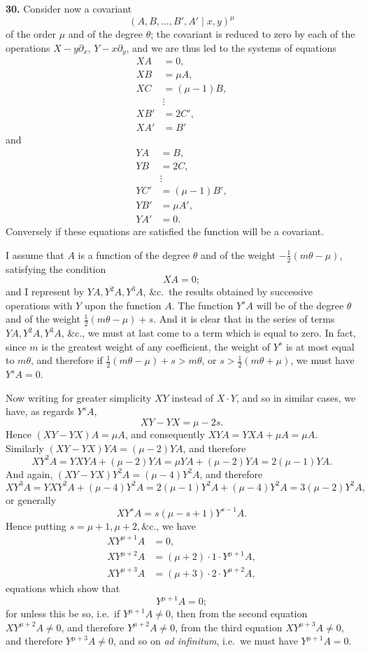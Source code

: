 \documentclass[11pt]{article}
\begin{document}
\textbf{30.} Consider now a covariant
\[
(A, B, \ldots, B', A' \mid x, y)^\mu
\]
of the order $\mu$ and of the degree $\theta$; the covariant is reduced to zero by each of the operations $X - y\partial_x$, $Y - x\partial_y$, and we are thus led to the systems of equations
\begin{align*}
XA &= 0, \\
XB &= \mu A, \\
XC &= (\mu - 1)B, \\
&\vdots \\
XB' &= 2 C', \\
XA' &= B'
\end{align*}
and
\begin{align*}
YA &= B, \\
YB &= 2 C, \\
&\vdots \\
YC' &= (\mu - 1)B', \\
YB' &= \mu A', \\
YA' &= 0.
\end{align*}
Conversely if these equations are satisfied the function will be a covariant.

I assume that $A$ is a function of the degree $\theta$ and of the weight $-\tfrac{1}{2}(m\theta - \mu)$, satisfying the condition
\[
XA = 0;
\]
and I represent by $YA, Y^2A, Y^3A$, \&c.\ the results obtained by successive operations with $Y$ upon the function $A$. The function $Y^s A$ will be of the degree $\theta$ and of the weight $\tfrac{1}{2}(m\theta - \mu) + s$. And it is clear that in the series of terms $YA, Y^2A, Y^3A$, \&c., we must at last come to a term which is equal to zero. In fact, since $m$ is the greatest weight of any coefficient, the weight of $Y^s$ is at most equal to $m\theta$, and therefore if $\tfrac{1}{2}(m\theta - \mu) + s > m\theta$, or $s > \tfrac{1}{2}(m\theta + \mu)$, we must have $Y^s A = 0$.

Now writing for greater simplicity $XY$ instead of $X\cdot Y$, and so in similar cases, we have, as regards $Y^s A$,
\[
XY - YX = \mu - 2s.
\]
Hence $(XY - YX)A = \mu A$, and consequently $XYA = YXA + \mu A = \mu A$.
Similarly $(XY - YX) YA = (\mu - 2) YA$, and therefore
\[
XY^2 A = YXYA + (\mu - 2) YA = \mu YA + (\mu - 2)YA = 2(\mu - 1) YA.
\]
And again, $(XY - YX) Y^2 A = (\mu - 4) Y^2 A$, and therefore
\[
XY^3 A = YXY^2A + (\mu - 4) Y^2A = 2(\mu - 1)Y^2A + (\mu - 4)Y^2A = 3(\mu - 2)Y^2A,
\]
or generally
\[
XY^s A = s(\mu - s + 1)Y^{s-1} A.
\]
Hence putting $s = \mu+1, \mu+2, \&\text{c.}$, we have
\begin{align*}
XY^{\mu+1}A &= 0, \\
XY^{\mu+2}A &= (\mu + 2)\cdot 1\cdot Y^{\mu+1}A, \\
XY^{\mu+3}A &= (\mu + 3)\cdot 2\cdot Y^{\mu+2}A,
\end{align*}
equations which show that
\[
Y^{\mu+1}A = 0;
\]
for unless this be so, i.e.\ if $Y^{\mu+1}A \neq 0$, then from the second equation $XY^{\mu+2}A \neq 0$, and therefore $Y^{\mu+2}A \neq 0$, from the third equation $XY^{\mu+3}A \neq 0$, and therefore $Y^{\mu+3}A \neq 0$, and so on \emph{ad infinitum}, i.e.\ we must have $Y^{\mu+1}A = 0$.
\end{document}
